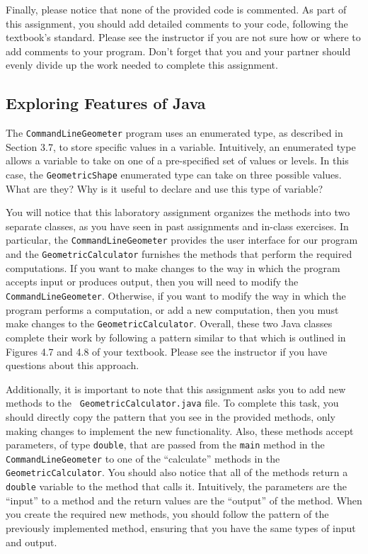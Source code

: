 Finally, please notice that none of the provided code is commented.  As part of this assignment, you should add
detailed comments to your code, following the textbook's standard. Please see the instructor if you are not sure how or
where to add comments to your program. Don't forget that you and your partner should evenly divide up the work needed to
complete this assignment. 

\vspace*{-.1in}
\subsection*{Exploring Features of Java}

The {\tt CommandLineGeometer} program uses an enumerated type, as described in Section 3.7, to store specific values in
a variable.  Intuitively, an enumerated type allows a variable to take on one of a pre-specified set of values or
levels.  In this case, the {\tt GeometricShape} enumerated type can take on three possible values.  What are they? Why
is it useful to declare and use this type of variable?

You will notice that this laboratory assignment organizes the methods into two separate classes, as you have seen in
past assignments and in-class exercises. In particular, the {\tt CommandLineGeometer} provides the user interface for
our program and the {\tt GeometricCalculator} furnishes the methods that perform the required computations.  If you want
to make changes to the way in which the program accepts input or produces output, then you will need to modify the {\tt
CommandLineGeometer}. Otherwise, if you want to modify the way in which the program performs a computation, or add a
new computation, then you must make changes to the {\tt GeometricCalculator}. Overall, these two Java classes complete
their work by following a pattern similar to that which is outlined in Figures 4.7 and 4.8 of your textbook. Please see
the instructor if you have questions about this approach.

Additionally, it is important to note that this assignment asks you to add new methods to the {\tt
GeometricCalculator.java} file.  To complete this task, you should directly copy the pattern that you see in the
provided methods, only making changes to implement the new functionality.  Also, these methods accept parameters, of
type {\tt double}, that are passed from the {\tt main} method in the {\tt CommandLineGeometer} to one of the
``calculate'' methods in the {\tt GeometricCalculator}. You should also notice that all of the methods return a {\tt
double} variable to the method that calls it.  Intuitively, the parameters are the ``input'' to a method and the return
values are the ``output'' of the method.  When you create the required new methods, you should follow the pattern of the
previously implemented method, ensuring that you have the same types of input and output.

